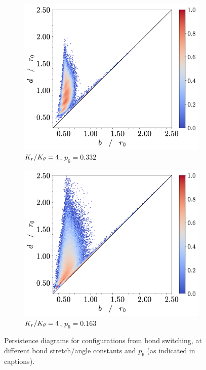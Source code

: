 \begin{figure}[tbp]
        \begin{subfigure}[b]{0.40\textwidth}
         \centering
         \includegraphics[width=\textwidth]{./figures/ph/t_k4_189_bs_pd.pdf}
         \caption{$K_r/K_\theta=4$, $p_6=0.332$}%
         \label{fig:bspdg}
     \end{subfigure}
     \hspace{1cm}
      \begin{subfigure}[b]{0.40\textwidth}
         \centering
         \includegraphics[width=\textwidth]{./figures/ph/t_k4_0_bs_pd.pdf}
         \caption{$K_r/K_\theta=4$, $p_6=0.163$}%
         \label{fig:bspdh}
     \end{subfigure}
     
	\caption{Persistence diagrams for configurations from bond switching, at different bond stretch/angle constants and $p_6$ (as indicated in captions).}
	\label{fig:bspd}
\end{figure}

